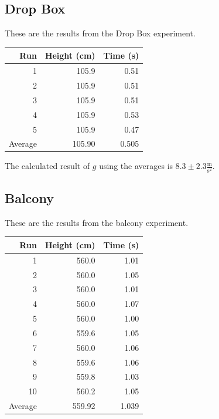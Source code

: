 \documentclass[12pt]{article}
\begin{document}
\subsection{Drop Box}
\label{sec:orgd6a2643}

These are the results from the Drop Box experiment.

\begin{center}
\begin{tabular}{r|r|r}
\hline
Run & Height (cm) & Time (s)\\
\hline
1 & 105.9 & 0.51\\
2 & 105.9 & 0.51\\
3 & 105.9 & 0.51\\
4 & 105.9 & 0.53\\
5 & 105.9 & 0.47\\
\hline
Average & 105.90 & 0.505\\
\end{tabular}
\end{center}

The calculated result of \(g\) using the averages is \(8.3\pm2.3 \frac{\text{m}}{\text{s}^{2}}\).
\subsection{Balcony}
\label{sec:orgdd98e67}

These are the results from the balcony experiment.

\begin{center}
\begin{tabular}{r|r|r}
\hline
Run & Height (cm) & Time (s)\\
\hline
1 & 560.0 & 1.01\\
2 & 560.0 & 1.05\\
3 & 560.0 & 1.01\\
4 & 560.0 & 1.07\\
5 & 560.0 & 1.00\\
6 & 559.6 & 1.05\\
7 & 560.0 & 1.06\\
8 & 559.6 & 1.06\\
9 & 559.8 & 1.03\\
10 & 560.2 & 1.05\\
\hline
Average & 559.92 & 1.039\\
\end{tabular}
\end{center}
\end{document}
